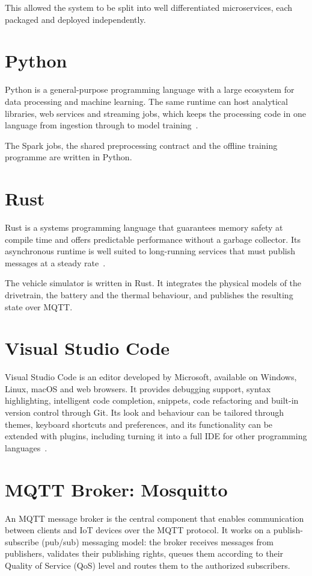 This allowed the system to be split into well differentiated microservices, each packaged and deployed independently.

\section{Python}
Python is a general-purpose programming language with a large ecosystem for data processing and machine learning. The same runtime can host analytical libraries, web services and streaming jobs, which keeps the processing code in one language from ingestion through to model training~\cite{python}.

The Spark jobs, the shared preprocessing contract and the offline training programme are written in Python.

\section{Rust}
Rust is a systems programming language that guarantees memory safety at compile time and offers predictable performance without a garbage collector. Its asynchronous runtime is well suited to long-running services that must publish messages at a steady rate~\cite{rust}.

The vehicle simulator is written in Rust. It integrates the physical models of the drivetrain, the battery and the thermal behaviour, and publishes the resulting state over MQTT.

\section{Visual Studio Code}
Visual Studio Code is an editor developed by Microsoft, available on Windows, Linux, macOS and web browsers. It provides debugging support, syntax highlighting, intelligent code completion, snippets, code refactoring and built-in version control through Git. Its look and behaviour can be tailored through themes, keyboard shortcuts and preferences, and its functionality can be extended with plugins, including turning it into a full IDE for other programming languages~\cite{vscode}.

\section{MQTT Broker: Mosquitto}
An MQTT message broker is the central component that enables communication between clients and IoT devices over the MQTT protocol. It works on a publish-subscribe (pub/sub) messaging model: the broker receives messages from publishers, validates their publishing rights, queues them according to their Quality of Service (QoS) level and routes them to the authorized subscribers.

